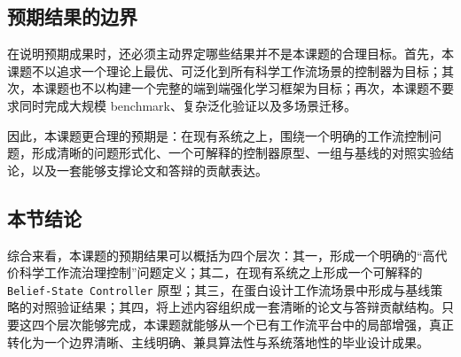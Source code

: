 \subsection{预期结果的边界}

在说明预期成果时，还必须主动界定哪些结果并不是本课题的合理目标。首先，本课题不以追求一个理论上最优、可泛化到所有科学工作流场景的控制器为目标；其次，本课题也不以构建一个完整的端到端强化学习框架为目标；再次，本课题不要求同时完成大规模 benchmark、复杂泛化验证以及多场景迁移。

因此，本课题更合理的预期是：在现有系统之上，围绕一个明确的工作流控制问题，形成清晰的问题形式化、一个可解释的控制器原型、一组与基线的对照实验结论，以及一套能够支撑论文和答辩的贡献表达。

\subsection{本节结论}

综合来看，本课题的预期结果可以概括为四个层次：其一，形成一个明确的“高代价科学工作流治理控制”问题定义；其二，在现有系统之上形成一个可解释的 \texttt{Belief-State Controller} 原型；其三，在蛋白设计工作流场景中形成与基线策略的对照验证结果；其四，将上述内容组织成一套清晰的论文与答辩贡献结构。只要这四个层次能够完成，本课题就能够从一个已有工作流平台中的局部增强，真正转化为一个边界清晰、主线明确、兼具算法性与系统落地性的毕业设计成果。
